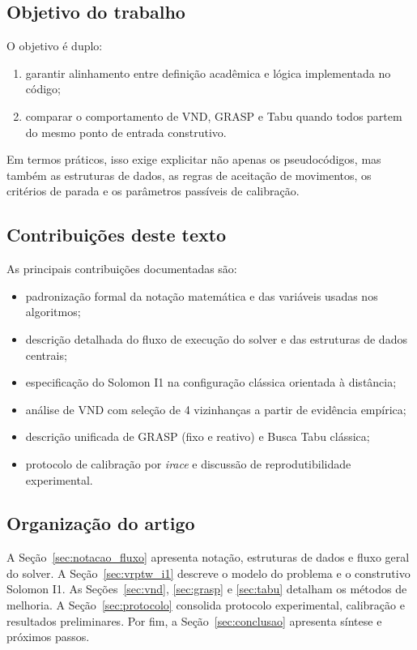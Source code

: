 \subsection{Objetivo do trabalho}

O objetivo é duplo:
\begin{enumerate}
  \item garantir alinhamento entre definição acadêmica e lógica implementada no código;
  \item comparar o comportamento de VND, GRASP e Tabu quando todos partem do mesmo ponto de entrada construtivo.
\end{enumerate}

Em termos práticos, isso exige explicitar não apenas os pseudocódigos, mas também as estruturas de dados, as regras de aceitação de movimentos, os critérios de parada e os parâmetros passíveis de calibração.

\subsection{Contribuições deste texto}

As principais contribuições documentadas são:
\begin{itemize}
  \item padronização formal da notação matemática e das variáveis usadas nos algoritmos;
  \item descrição detalhada do fluxo de execução do solver e das estruturas de dados centrais;
  \item especificação do Solomon I1 na configuração clássica orientada à distância;
  \item análise de VND com seleção de 4 vizinhanças a partir de evidência empírica;
  \item descrição unificada de GRASP (fixo e reativo) e Busca Tabu clássica;
  \item protocolo de calibração por \emph{irace} e discussão de reprodutibilidade experimental.
\end{itemize}

\subsection{Organização do artigo}

A Seção~\ref{sec:notacao_fluxo} apresenta notação, estruturas de dados e fluxo geral do solver. A Seção~\ref{sec:vrptw_i1} descreve o modelo do problema e o construtivo Solomon I1. As Seções~\ref{sec:vnd}, \ref{sec:grasp} e \ref{sec:tabu} detalham os métodos de melhoria. A Seção~\ref{sec:protocolo} consolida protocolo experimental, calibração e resultados preliminares. Por fim, a Seção~\ref{sec:conclusao} apresenta síntese e próximos passos.
